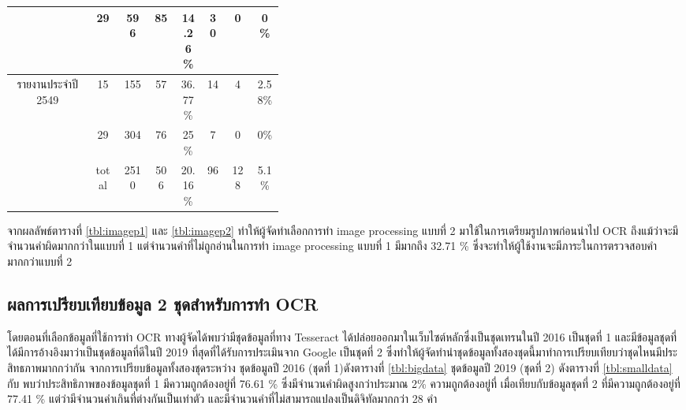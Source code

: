 \begin{table}[H]
\begin{tabular}{|c|c|c|p{0.1\linewidth}|p{0.1\linewidth}|c|p{0.1\linewidth}|p{0.1\linewidth}|}
                                                & 29                         & \multicolumn{1}{c|}{596 }      & \multicolumn{1}{c|}{85 }         & \multicolumn{1}{c|}{14.26\%} & \multicolumn{1}{c|}{30}     & \multicolumn{1}{c|}{0  }             & \multicolumn{1}{c|}{0\%    } \\ \hline
            \multirow{2}{*}{รายงานประจำปี 2549}   & 15                         & \multicolumn{1}{c|}{155 }      & \multicolumn{1}{c|}{57 }         & \multicolumn{1}{c|}{36.77\%} & \multicolumn{1}{c|}{14}     & \multicolumn{1}{c|}{4  }             & \multicolumn{1}{c|}{2.58\% } \\ \cline{2-8} 
                                                & 29                         & \multicolumn{1}{c|}{304 }      & \multicolumn{1}{c|}{76 }         & \multicolumn{1}{c|}{25\%   } & \multicolumn{1}{c|}{7 }     & \multicolumn{1}{c|}{0  }             & \multicolumn{1}{c|}{0\%    } \\ \hline
            \multicolumn{1}{|l|}{}              & \multicolumn{1}{c|}{total} & \multicolumn{1}{c|}{2510}      & \multicolumn{1}{c|}{506}         & \multicolumn{1}{c|}{20.16\%} & \multicolumn{1}{c|}{96}     & \multicolumn{1}{c|}{128}             & \multicolumn{1}{c|}{5.1\%  } \\ \hline
            \end{tabular}
            \end{table}

จากผลลัพธ์ตารางที่ \ref{tbl:imagep1} และ \ref{tbl:imagep2} ทำให้ผู้จัดทำเลือกการทำ image processing แบบที่ 2 มาใช้ในการเตรียมรูปภาพก่อนนำไป OCR
ถึงแม้ว่าจะมีจำนวนคำผิดมากกว่าในแบบที่ 1 แต่จำนวนคำที่ไม่ถูกอ่านในการทำ image processing แบบที่ 1 มีมากถึง 32.71 \% ซึ่งจะทำให้ผู้ใช้งานจะมีภาระในการตรวจสอบคำมากกว่าแบบที่ 2 


\subsection{ผลการเปรียบเทียบข้อมูล 2 ชุดสำหรับการทำ OCR}

โดยตอนที่เลือกข้อมูลที่ใช้การทำ OCR ทางผู้จัดได้พบว่ามีชุดข้อมูลที่ทาง Tesseract ได้ปล่อยออกมาในเว็บไซต์หลักซึ่งเป็นชุดเทรนในปี 2016 เป็นชุดที่ 1
และมีข้อมูลชุดที่ได้มีการอ้างอิงมาว่าเป็นชุดข้อมูลที่ดีในปี 2019 ที่สุดที่ได้รับการประเมินจาก Google เป็นชุดที่ 2
ซึ่งทำให้ผู้จัดทำนำชุดข้อมูลทั้งสองชุดนี้มาทำการเปรียบเทียบว่าชุดไหนมีประสิทธภาพมากกว่ากัน
จากการเปรียบข้อมูลทั้งสองชุดระหว่าง ชุดข้อมูลปี 2016 (ชุดที่ 1)ดังตารางที่ \ref{tbl:bigdata} ชุดข้อมูลปี 2019 (ชุดที่ 2) ดังตารางที่ \ref{tbl:smalldata} กับ
พบว่าประสิทธิภาพของข้อมูลชุดที่ 1 มีความถูกต้องอยู่ที่ 76.61 \% ซึ่งมีจำนวนคำผิดสูงกว่าประมาณ 2\% ความถูกต้องอยู่ที่ 
เมื่อเทียบกับข้อมูลชุดที่ 2 ที่มีความถูกต้องอยู่ที่ 77.41 \% แต่ว่ามีจำนวนคำเกินที่ต่างกันเป็นเท่าตัว 
และมีจำนวนคำที่ไม่สามารถแปลงเป็นดิจิทัลมากกว่า 28 คำ

